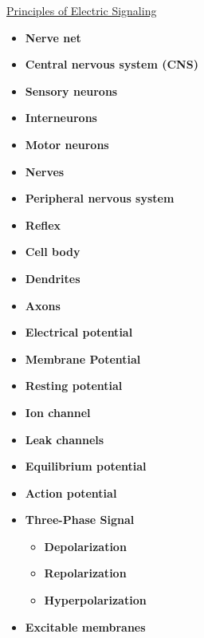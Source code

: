 \documentclass[12pt,letterpaper]{article}
\begin{document}
\hypertarget{43.1}{}
\begin{secbox}{\hyperlink{43}{Principles of Electric Signaling}}{
    \begin{itemize}
        \item \textbf{Nerve net}
        \item \textbf{Central nervous system (CNS)}
        \item \textbf{Sensory neurons}
        \item \textbf{Interneurons}
        \item \textbf{Motor neurons}
        \item \textbf{Nerves}
        \item \textbf{Peripheral nervous system}
        \item \textbf{Reflex}
        \item \textbf{Cell body}
        \item \textbf{Dendrites}
        \item \textbf{Axons}
        \item \textbf{Electrical potential}
        \item \textbf{Membrane Potential}
        \item \textbf{Resting potential}
        \item \textbf{Ion channel}
        \item \textbf{Leak channels}
        \item \textbf{Equilibrium potential}
        \item \textbf{Action potential }
        \item \textbf{Three-Phase Signal}
            \begin{itemize}
                \item \textbf{Depolarization}
                \item \textbf{Repolarization}
                \item \textbf{Hyperpolarization}
            \end{itemize}
        \item \textbf{Excitable membranes}
    \end{itemize}
}\end{secbox}
\end{document}
